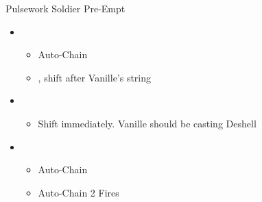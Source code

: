 \begin{battle}[0:20]{Pulsework Soldier Pre-Empt}
	\begin{itemize}
		\item \first
		      \begin{itemize}
			      \item Auto-Chain
			      \item \stagger, shift after Vanille's string
		      \end{itemize}
		\item \fourth
		      \begin{itemize}
			      \item Shift immediately. Vanille should be casting Deshell
		      \end{itemize}
		\item \first
		      \begin{itemize}
			      \item Auto-Chain
			      \item Auto-Chain 2 Fires
		      \end{itemize}
	\end{itemize}
\end{battle}

